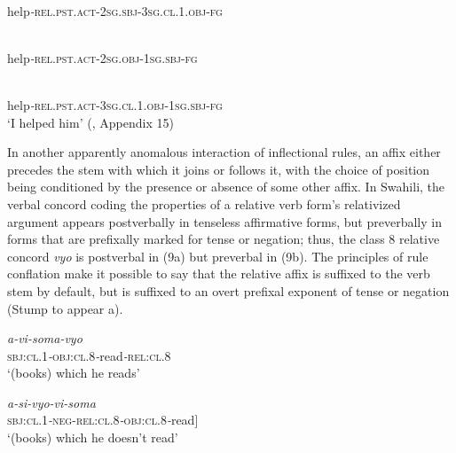 \documentclass[output=paper,
modfonts
]{LSP/langsci}
\begin{document}
	\\
	{help\textit{\nobreakdash-}\textsc{rel.pst.act}\textsc{\nobreakdash-}\textsc{2sg.sbj}\textsc{\nobreakdash-}\textsc{3sg.cl.1.obj}\textsc{\nobreakdash-fg}}\\
	
	\\
	{help\textit{\nobreakdash-}\textsc{rel.pst.act}\textsc{\nobreakdash-}\textsc{2}\textsc{sg.obj}\textsc{\nobreakdash-}\textsc{1sg}\textsc{.}\textsc{sbj}\textsc{\nobreakdash-fg}}\\
	
	\\
	{help\textit{\nobreakdash-}\textsc{rel.pst.act}\textsc{\nobreakdash-}\textsc{3sg.cl.1.obj}\textsc{\nobreakdash-}\textsc{1sg.sbj}\textsc{\nobreakdash-fg}}\\
	\glt ‘I helped him’ \hfill (\citealt{Arnott1970}, Appendix 15)\\
	
	\z
\z

In another apparently anomalous interaction of inflectional rules,  an affix either precedes the stem with which it joins or follows it, with the choice of position being conditioned by the presence or absence of some other affix.  In Swahili, the verbal concord coding the properties of a relative verb form’s relativized argument appears postverbally in tenseless affirmative forms, but preverbally in forms that are prefixally marked for tense or negation; thus, the class 8 relative concord \textit{vyo} is postverbal in (9a) but preverbal in (9b).  The principles of rule conflation make it possible to say that the relative affix is suffixed to the verb stem by default, but is suffixed to an overt prefixal exponent of tense or negation (Stump to appear a).

\ea%
    \label{ex:9}
    	\ea
	\gll \textit{a\nobreakdash-vi\nobreakdash-soma\nobreakdash-vyo} \\ 
	\textsc{sbj:cl.}1\textit{\nobreakdash-}\textsc{obj:cl.}8\textit{\nobreakdash-}read\textit{\nobreakdash-}\textsc{rel:cl.}8 \\
	 \glt ‘(books) which he reads’
	 
	 \ex 
	 \gll \textit{a\nobreakdash-si\nobreakdash-vyo\nobreakdash-vi\nobreakdash-soma}\\
	 \textsc{sbj:cl.}1\textit{\nobreakdash-}\textsc{neg}\textsc{\nobreakdash-}\textsc{rel:cl.}8\textit{\nobreakdash-}\textsc{obj:cl.}8\textit{\nobreakdash-}read]\\
	 \glt ‘(books) which he doesn’t read’
\end{document}
